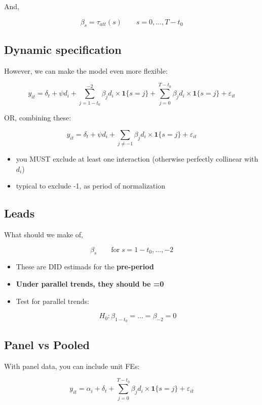 \documentclass[
  letterpaper,
  DIV=11,
  numbers=noendperiod]{scrartcl}
\begin{document}
And,

\[
  \beta_s = \tau_{att}(s) \qquad s = 0,\dots,T-t_0
\]

\subsection{Dynamic specification}\label{dynamic-specification}

However, we can make the model even more flexible:

\[
  y_{it} = \delta_t + \psi d_i + \sum_{j=1-t_0}^{-2}\beta_jd_i\times\mathbf{1}\{s=j\}+\sum_{j=0}^{T-t_0}\beta_jd_i\times\mathbf{1}\{s=j\} + \varepsilon_{it}
\]

OR, combining these:

\[
  y_{it} = \delta_t + \psi d_i + \sum_{j\neq-1}\beta_jd_i\times\mathbf{1}\{s=j\} + \varepsilon_{it}
\]

\begin{itemize}
\item
  you MUST exclude at least one interaction (otherwise perfectly
  collinear with \(d_i\))
\item
  typical to exclude -1, as period of normalization
\end{itemize}

\subsection{Leads}\label{leads}

What should we make of,

\[
  \beta_s \qquad\text{for}\; s=1-t_0,\dots,-2
\]

\hfill\break

\begin{itemize}
\item
  These are DID estimads for the \textbf{pre-period}
\item
  \textbf{Under parallel trends, they should be =0}
\item
  Test for parallel trends:

  \[
    H_0: \beta_{1-t_0}=\dots=\beta_{-2}=0
  \]
\end{itemize}

\subsection{Panel vs Pooled}\label{panel-vs-pooled}

With panel data, you can include unit FEs:

\[
  y_{it} = \alpha_i + \delta_t + \sum_{j=0}^{T-t_0}\beta_jd_i\times\mathbf{1}\{s=j\} + \varepsilon_{it}
\]
\end{document}
